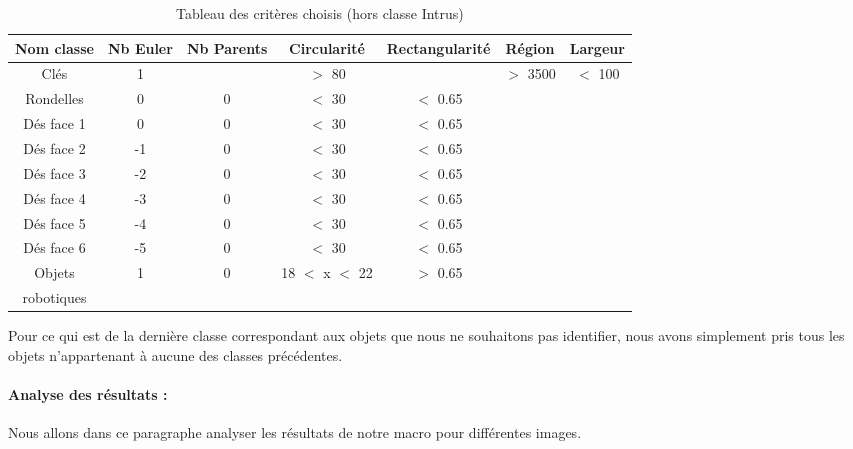 \documentclass{scrreprt}
\begin{document}
\begin{table}[!h]
        \begin{center}
                \begin{tabular}{|c|c|c|c|c|c|c|}
                   \hline
                   Nom classe & Nb Euler & Nb Parents & Circularité & Rectangularité & Région &  Largeur \\
                   \hline
		   Clés & 1 & & $>$ 80 & & $>$ 3500 & $<$ 100 \\
		   \hline
		   Rondelles & 0 & 0 & $<$ 30 & $<$ 0.65 & & \\
		   \hline
		   Dés face 1 & 0 & 0 & $<$ 30 & $<$ 0.65 & & \\
		   \hline
                   Dés face 2 & -1 & 0 & $<$ 30 & $<$ 0.65 & & \\
                   \hline
                   Dés face 3 & -2 & 0 & $<$ 30 & $<$ 0.65 & & \\
                   \hline
                   Dés face 4 & -3 & 0 & $<$ 30 & $<$ 0.65 & & \\
                   \hline
                   Dés face 5 & -4 & 0 & $<$ 30 & $<$ 0.65 & & \\
                   \hline
                   Dés face 6 & -5 & 0 & $<$ 30 & $<$ 0.65 & & \\
                   \hline
		   Objets & 1 & 0 &  18 $<$ x $<$ 22 & $>$ 0.65 & & \\
		   robotiques & & & & & &\\
                   \hline 
                \end{tabular}
        \end{center}
        \caption{Tableau des critères choisis (hors classe Intrus)}
\end{table}
  
Pour ce qui est de la dernière classe correspondant aux objets que nous ne souhaitons
pas identifier, nous avons simplement pris tous les objets n'appartenant à aucune des classes
précédentes.

\newpage
\paragraph{Analyse des résultats :}
 
Nous allons dans ce paragraphe analyser les résultats de notre macro pour différentes images.
\end{document}
